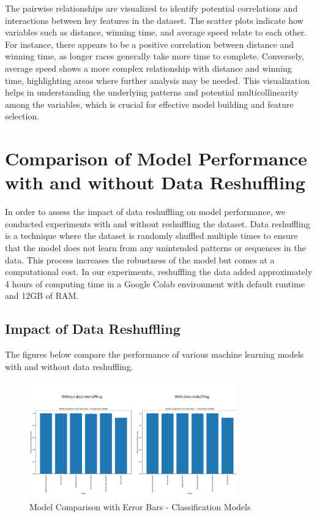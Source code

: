 \documentclass{article}
\begin{document}
The pairwise relationships are visualized to identify potential correlations and interactions between key features in the dataset. The scatter plots indicate how variables such as distance, winning time, and average speed relate to each other. For instance, there appears to be a positive correlation between distance and winning time, as longer races generally take more time to complete. Conversely, average speed shows a more complex relationship with distance and winning time, highlighting areas where further analysis may be needed. This visualization helps in understanding the underlying patterns and potential multicollinearity among the variables, which is crucial for effective model building and feature selection.

\section*{Comparison of Model Performance with and without Data Reshuffling}

In order to assess the impact of data reshuffling on model performance, we conducted experiments with and without reshuffling the dataset. Data reshuffling is a technique where the dataset is randomly shuffled multiple times to ensure that the model does not learn from any unintended patterns or sequences in the data. This process increases the robustness of the model but comes at a computational cost. In our experiments, reshuffling the data added approximately 4 hours of computing time in a Google Colab environment with default runtime and 12GB of RAM.

\subsection*{Impact of Data Reshuffling}

The figures below compare the performance of various machine learning models with and without data reshuffling. 

\begin{figure}[H]
    \centering
    \includegraphics[width=0.8\textwidth]{images/classification_models2.png} %
    \caption{Model Comparison with Error Bars - Classification Models}
    \label{fig:classification_models}
\end{figure}
\end{document}
